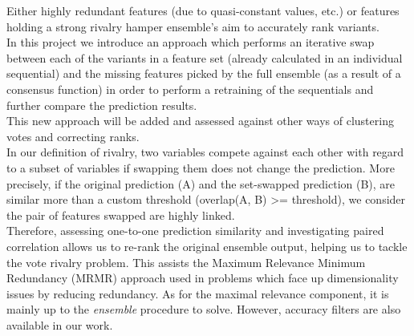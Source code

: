 Either highly redundant features (due to quasi-constant values, etc.) or features holding a strong rivalry hamper ensemble's aim to accurately rank variants.
\\

In this project we introduce an approach which performs an iterative swap between each of the variants in a feature set (already calculated in an individual sequential) and the missing features picked by the full ensemble (as a result of a consensus function) in order to perform a retraining of the sequentials and further compare the prediction results.
\\

This new approach will be added and assessed against other ways of clustering votes and correcting ranks.
\\

In our definition of rivalry, two variables compete against each other with regard to a subset of variables if swapping them does not change the prediction.
More precisely, if the original prediction (A) and the set-swapped prediction (B), are similar more than a custom threshold (overlap(A, B) >= threshold), we consider the pair of features swapped are highly linked.
\\

Therefore, assessing one-to-one prediction similarity and investigating paired correlation allows us to re-rank the original ensemble output, helping us to tackle the vote rivalry problem. This assists the Maximum Relevance Minimum Redundancy (MRMR) approach used in problems which face up dimensionality issues by reducing redundancy. As for the maximal relevance component, it is mainly up to the \emph{ensemble} procedure to solve. However, accuracy filters are also available in our work.